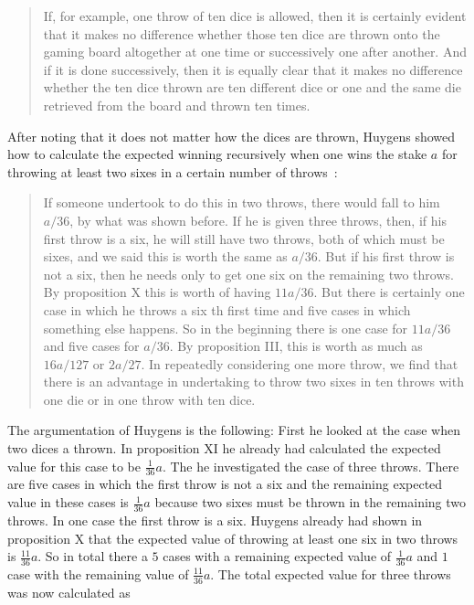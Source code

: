 \begin{quotation}
  If, for example, one throw of ten dice is allowed, then it is certainly evident that it makes no difference whether those ten dice are thrown onto the gaming board altogether at one time or successively one after another. And if it is done successively, then it is equally clear that it makes no difference whether the ten dice thrown are ten different dice or one and the same die retrieved from the board and thrown ten times.
\end{quotation}

After noting that it does not matter how the dices are thrown, Huygens showed how to calculate the expected winning recursively when one wins the stake $a$ for throwing at least two sixes in a certain number of throws~\cite[p. 163]{bernoulli}:

\begin{quotation}
  If someone undertook to do this in two throws, there would fall to him $a/36$, by what was shown before. If he is given three throws, then, if his first throw is a six, he will still have two throws, both of which must be sixes, and we said this is worth the same as $a/36$. But if his first throw is not a six, then he needs only to get one six on the remaining two throws. By proposition X this is worth of having $11a/36$. But there is certainly one case in which he throws a six th first time and five cases in which something else happens. So in the beginning there is one case for $11a/36$ and five cases for $a/36$. By proposition III, this is worth as much as $16a/127$ or $2a/27$. In repeatedly considering one more throw, we find that there is an advantage in undertaking to throw two sixes in ten throws with one die or in one throw with ten dice.
\end{quotation}

The argumentation of Huygens is the following: First he looked at the case when two dices a thrown. In proposition XI he already had calculated the expected value for this case to be $\tfrac 1{36}a$. The he investigated the case of three throws. There are five cases in which the first throw is not a six and the remaining expected value in these cases is $\tfrac 1{36}a$ because two sixes must be thrown in the remaining two throws. In one case the first throw is a six. Huygens already had shown in proposition X that the expected value of throwing at least one six in two throws is $\tfrac{11}{36}a$. So in total there a $5$ cases with a remaining expected value of $\tfrac 1{36}a$ and $1$ case with the remaining value of $\tfrac{11}{36} a$. The total expected value for three throws was now calculated as

